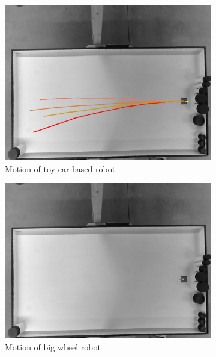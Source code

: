 \begin{figure}
	\centering
	\begin{subfigure}[t]{0.3\textwidth}
		\includegraphics[width=\textwidth]{../hardwareX_paper/robot_17.png}
		\caption{Motion of toy car based robot}
	\end{subfigure}
	\begin{subfigure}[t]{0.3\textwidth}
		\includegraphics[width=\textwidth]{../hardwareX_paper/robot_1.png}
		\caption{Motion of big wheel robot}
	\end{subfigure}
	\begin{subfigure}[t]{0.3\textwidth}

\end{subfigure}
\end{figure}
